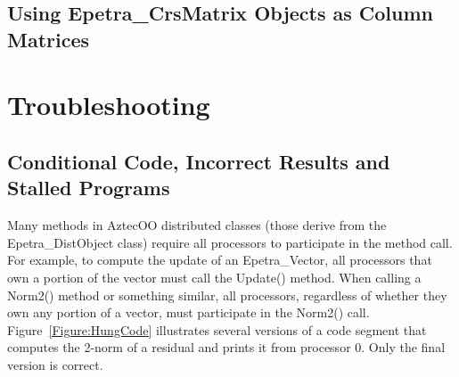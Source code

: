 \documentclass[12pt,relax]{AztecOOUserGuide}
\renewcommand{\vector}{Epetra\_Vector}
\newcommand{\crsmatrix}{Epetra\_CrsMatrix}
\newcommand{\distobject}{Epetra\_DistObject}
\begin{document}
\subsection {Using \crsmatrix{} Objects as Column Matrices}

\clearpage



\appendix
\section{Troubleshooting}
\label{Section:Troubleshooting}
\subsection{Conditional Code, Incorrect Results and Stalled Programs}
Many methods in AztecOO distributed classes (those derive from the
\distobject{} class) require all processors to
participate in the method call.  For example, to compute the update of
an \vector{}, all processors that own a portion of the vector must
call the Update() method.  When calling a Norm2() method or something
similar, all processors, regardless of whether they own any portion of
a vector, must participate in the Norm2() call.  
Figure~\ref{Figure:HungCode} illustrates
several versions of a code segment that computes the 2-norm of a residual
and prints it from processor 0.  Only the final version is correct.
\end{document}
